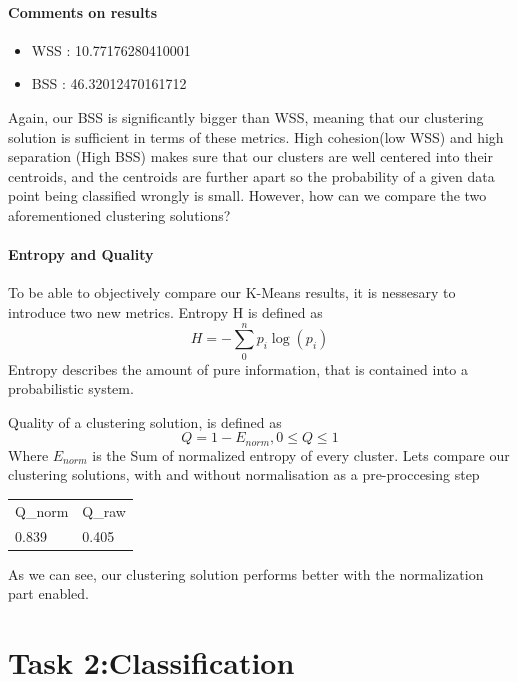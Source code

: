 \documentclass[openany]{book}
\begin{document}
			\subsubsection{Comments on results}
				\begin{itemize}
					\item WSS : 10.77176280410001
					\item BSS : 46.32012470161712
				\end{itemize}
				Again, our BSS is significantly bigger than WSS, meaning that our clustering solution is sufficient in terms of these metrics. High cohesion(low WSS)
				and high separation (High BSS) makes sure that our clusters are well centered into their centroids, and the centroids are further apart so 
				the probability of a given data point being classified wrongly is small. However, how can we compare the two aforementioned clustering solutions?
			\subsubsection{Entropy and Quality}
				To be able to objectively compare our K-Means results, it is nessesary to introduce two new metrics.
				Entropy H is defined as
				\begin{equation}
					H=-\sum_{0}^{n}{p_i\log(p_i)}
				\end{equation}
				Entropy describes the amount of pure information, that is contained into a probabilistic system.
				
				Quality of a clustering solution, is defined as
				\begin{equation}
					Q=1-E_{norm}, 0\leq Q \leq 1
				\end{equation}
				Where $E_{norm}$ is the Sum of normalized entropy of every cluster. Lets compare our clustering solutions,
				with and without normalisation as a pre-proccesing step
				\begin{table}[H]
					\centering
					\begin{tabular}{ll}
						Q\_norm & Q\_raw \\
						0.839   & 0.405 
					\end{tabular}
				\end{table}
				As we can see, our clustering solution performs better with the normalization part enabled.
	\chapter{Task 2:Classification}
\end{document}

